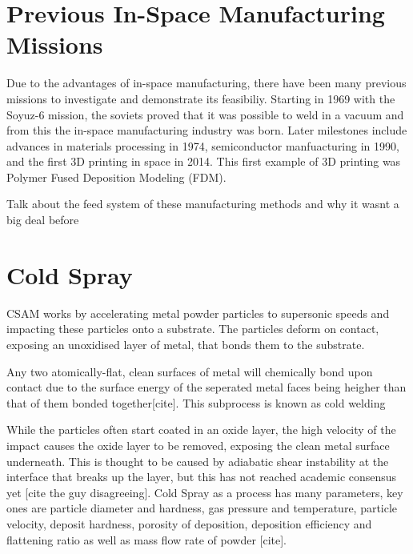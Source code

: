 \section{Previous In-Space Manufacturing Missions}
Due to the advantages of in-space manufacturing, there have been many previous missions to investigate and demonstrate its feasibiliy. Starting in 1969 with the Soyuz-6 mission\cite{nasa1984welding}, the soviets proved that it was possible to weld in a vacuum and from this the in-space manufacturing industry was born. Later milestones include advances in materials processing in 1974\cite{gatos1974indium}, semiconductor manfuacturing in 1990\cite{zak_kristall}, and the first 3D printing in space in 2014\cite{johnston2014zeroG}. This first example of 3D printing was Polymer Fused Deposition Modeling (FDM).

Talk about the feed system of these manufacturing methods and why it wasnt a big deal before


\section{Cold Spray}
CSAM works by accelerating metal powder particles to supersonic speeds and impacting these particles onto a substrate. The particles deform on contact, exposing an unoxidised layer of metal, that bonds them to the substrate. 

Any two atomically-flat, clean surfaces of metal will chemically bond upon contact due to the surface energy of the seperated metal faces being heigher than that of them bonded together[cite]. This subprocess is known as cold welding 

While the particles often start coated in an oxide layer, the high velocity of the impact causes the oxide layer to be removed, exposing the clean metal surface underneath. This is thought to be caused by adiabatic shear instability at the interface that breaks up the layer\cite{assadi2016cold}, but this has not reached academic consensus yet [cite the guy disagreeing]. 
Cold Spray as a process has many parameters, key ones are particle diameter and hardness, gas pressure and temperature, particle velocity, deposit hardness, porosity of deposition, deposition efficiency and flattening ratio\cite{Vaz2023} as well as mass flow rate of powder [cite].

